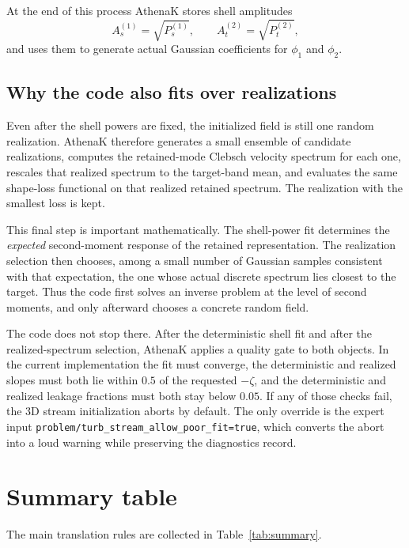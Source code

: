 \documentclass[11pt]{article}
\newcommand{\code}[1]{\texttt{#1}}
\begin{document}
At the end of this process AthenaK stores shell amplitudes
\begin{equation}
A_s^{(1)} = \sqrt{P_s^{(1)}},
\qquad
A_t^{(2)} = \sqrt{P_t^{(2)}},
\end{equation}
and uses them to generate actual Gaussian coefficients for $\phi_1$ and $\phi_2$.

\subsection{Why the code also fits over realizations}
Even after the shell powers are fixed, the initialized field is still one random realization. AthenaK therefore generates a small ensemble of candidate realizations, computes the retained-mode Clebsch velocity spectrum for each one, rescales that realized spectrum to the target-band mean, and evaluates the same shape-loss functional on that realized retained spectrum. The realization with the smallest loss is kept.

This final step is important mathematically. The shell-power fit determines the \emph{expected} second-moment response of the retained representation. The realization selection then chooses, among a small number of Gaussian samples consistent with that expectation, the one whose actual discrete spectrum lies closest to the target. Thus the code first solves an inverse problem at the level of second moments, and only afterward chooses a concrete random field.

The code does not stop there. After the deterministic shell fit and after the realized-spectrum selection, AthenaK applies a quality gate to both objects. In the current implementation the fit must converge, the deterministic and realized slopes must both lie within $0.5$ of the requested $-\zeta$, and the deterministic and realized leakage fractions must both stay below $0.05$. If any of those checks fail, the 3D stream initialization aborts by default. The only override is the expert input \code{problem/turb\_stream\_allow\_poor\_fit=true}, which converts the abort into a loud warning while preserving the diagnostics record.

\section{Summary table}
The main translation rules are collected in Table~\ref{tab:summary}.
\end{document}
